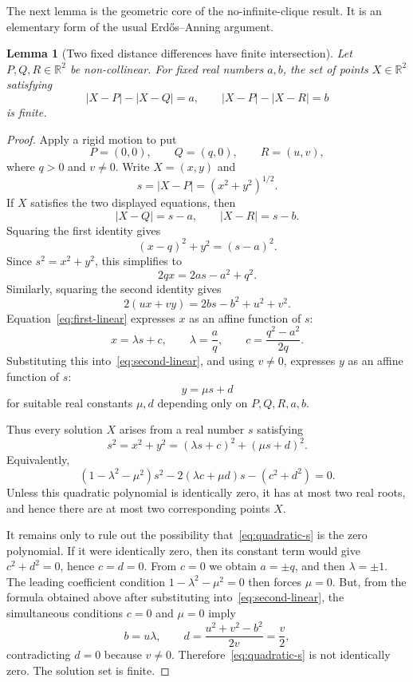 \documentclass[11pt,a4paper]{amsart}
\newtheorem{lemma}[theorem]{Lemma}
\theoremstyle{definition}
\newcommand{\R}{\mathbb{R}}
\begin{document}
The next lemma is the geometric core of the no-infinite-clique result.  It is an elementary form of the usual Erd\H{o}s--Anning argument.

\begin{lemma}[Two fixed distance differences have finite intersection]\label{lem:finite-difference-intersection}
Let $P,Q,R\in\R^2$ be non-collinear.  For fixed real numbers $a,b$, the set of points $X\in\R^2$ satisfying
\[
        |X-P|-|X-Q|=a,
        \qquad
        |X-P|-|X-R|=b
\]
is finite.
\end{lemma}

\begin{proof}
Apply a rigid motion to put
\[
        P=(0,0),\qquad Q=(q,0),\qquad R=(u,v),
\]
where $q>0$ and $v\neq 0$.  Write $X=(x,y)$ and
\[
        s=|X-P|=(x^2+y^2)^{1/2}.
\]
If $X$ satisfies the two displayed equations, then
\[
        |X-Q|=s-a,
        \qquad
        |X-R|=s-b.
\]
Squaring the first identity gives
\[
        (x-q)^2+y^2=(s-a)^2.
\]
Since $s^2=x^2+y^2$, this simplifies to
\begin{equation}\label{eq:first-linear}
        2qx=2as-a^2+q^2.
\end{equation}
Similarly, squaring the second identity gives
\begin{equation}\label{eq:second-linear}
        2(ux+vy)=2bs-b^2+u^2+v^2.
\end{equation}
Equation~\eqref{eq:first-linear} expresses $x$ as an affine function of $s$:
\[
        x=\lambda s+c,
        \qquad
        \lambda=\frac{a}{q},
        \qquad
        c=\frac{q^2-a^2}{2q}.
\]
Substituting this into~\eqref{eq:second-linear}, and using $v\neq 0$, expresses $y$ as an affine function of $s$:
\[
        y=\mu s+d
\]
for suitable real constants $\mu,d$ depending only on $P,Q,R,a,b$.

Thus every solution $X$ arises from a real number $s$ satisfying
\[
        s^2=x^2+y^2=(\lambda s+c)^2+(\mu s+d)^2.
\]
Equivalently,
\begin{equation}\label{eq:quadratic-s}
        (1-\lambda^2-\mu^2)s^2-2(\lambda c+\mu d)s-(c^2+d^2)=0.
\end{equation}
Unless this quadratic polynomial is identically zero, it has at most two real roots, and hence there are at most two corresponding points $X$.

It remains only to rule out the possibility that~\eqref{eq:quadratic-s} is the zero polynomial.  If it were identically zero, then its constant term would give $c^2+d^2=0$, hence $c=d=0$.  From $c=0$ we obtain $a=\pm q$, and then $\lambda=\pm 1$.  The leading coefficient condition $1-\lambda^2-\mu^2=0$ then forces $\mu=0$.  But, from the formula obtained above after substituting into~\eqref{eq:second-linear}, the simultaneous conditions $c=0$ and $\mu=0$ imply
\[
        b=u\lambda,
        \qquad
        d=\frac{u^2+v^2-b^2}{2v}=\frac{v}{2},
\]
contradicting $d=0$ because $v\neq 0$.  Therefore~\eqref{eq:quadratic-s} is not identically zero.  The solution set is finite.
\end{proof}
\end{document}
